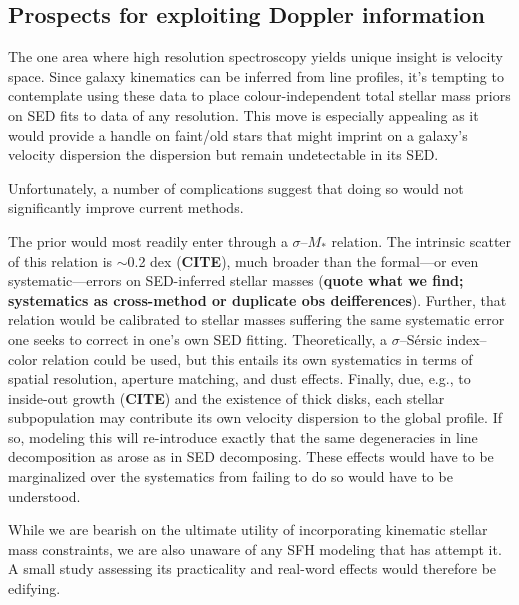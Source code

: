 \documentclass[a4paper,fleqn,usenatbib]{mnras}
\newcommand{\Mstel}{M_\ast}
\newcommand{\bfr}{\bf\color{red}}
\newcommand{\CITE}{{\bfr CITE}}
\begin{document}

\subsection{Prospects for exploiting Doppler information}
\label{sec:redshifts}

The one area where high resolution spectroscopy yields unique insight is velocity space. Since
galaxy kinematics can be inferred from line profiles, it's tempting to contemplate using these data
to place colour-independent total stellar mass priors on SED fits to data of any resolution. This
move is especially appealing as it would provide a handle on faint/old stars that might imprint on 
a galaxy's velocity dispersion the dispersion but remain undetectable in its SED. 

Unfortunately, a number of complications suggest that doing so would not significantly improve
current methods.

The prior would most readily enter through a $\sigma$--$\Mstel$ relation. The intrinsic scatter
of this relation is $\sim$0.2 dex (\CITE), much broader than the formal---or even systematic---errors 
on SED-inferred stellar masses ({\bfr quote what we find; systematics as cross-method or duplicate
obs deifferences}). Further, that relation would be calibrated to stellar masses suffering the same 
systematic error one seeks to correct in one's own SED fitting. Theoretically, a $\sigma$--S\'{e}rsic 
index--color relation could be used, but this entails its own systematics in terms of spatial resolution, 
aperture matching, and dust effects. Finally, due, e.g., to inside-out growth (\CITE) 
and the existence of thick disks, each stellar subpopulation may contribute its own velocity 
dispersion to the global profile. If so, modeling this will re-introduce exactly that the same 
degeneracies in line decomposition as arose as in SED decomposing. These 
effects would have to be marginalized over the systematics from failing to do so would have to
be understood.

While we are bearish on the ultimate utility of incorporating kinematic stellar mass constraints, 
we are also unaware of any SFH modeling that has attempt it. A small study assessing its 
practicality and real-word effects would therefore be edifying.
\end{document}
